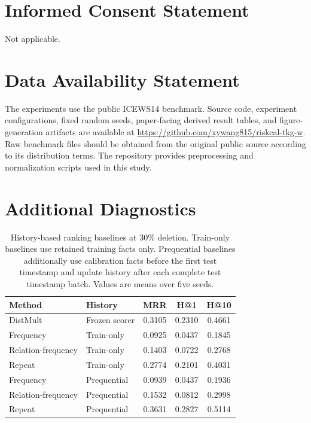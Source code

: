 \documentclass[information,article,submit,oneauthor,pdftex]{Definitions/mdpi}
\begin{document}
\section*{Informed Consent Statement}
Not applicable.

\section*{Data Availability Statement}
The experiments use the public ICEWS14 benchmark. Source code, experiment configurations, fixed random seeds, paper-facing derived result tables, and figure-generation artifacts are available at \url{https://github.com/xywang815/riskcal-tkg-w}. Raw benchmark files should be obtained from the original public source according to its distribution terms. The repository provides preprocessing and normalization scripts used in this study.


\appendixstart
\appendix
\section{Additional Diagnostics}
\label{app:protocol}

\begin{table}[t]
\centering
\caption{History-based ranking baselines at 30\% deletion. Train-only
baselines use retained training facts only. Prequential baselines additionally
use calibration facts before the first test timestamp and update history after
each complete test timestamp batch. Values are means over five seeds.}
\label{tab:history-baselines}
\scriptsize
\setlength{\tabcolsep}{2pt}
\begin{tabular}{@{}llccc@{}}
\toprule
Method & History & MRR & H@1 & H@10\\
\midrule
DistMult & Frozen scorer & 0.3105 & 0.2310 & 0.4661\\
Frequency & Train-only & 0.0925 & 0.0437 & 0.1845\\
Relation-frequency & Train-only & 0.1403 & 0.0722 & 0.2768\\
Repeat & Train-only & 0.2774 & 0.2101 & 0.4031\\
Frequency & Prequential & 0.0939 & 0.0437 & 0.1936\\
Relation-frequency & Prequential & 0.1532 & 0.0812 & 0.2998\\
Repeat & Prequential & 0.3631 & 0.2827 & 0.5114\\
\bottomrule
\end{tabular}
\end{table}
\end{document}
